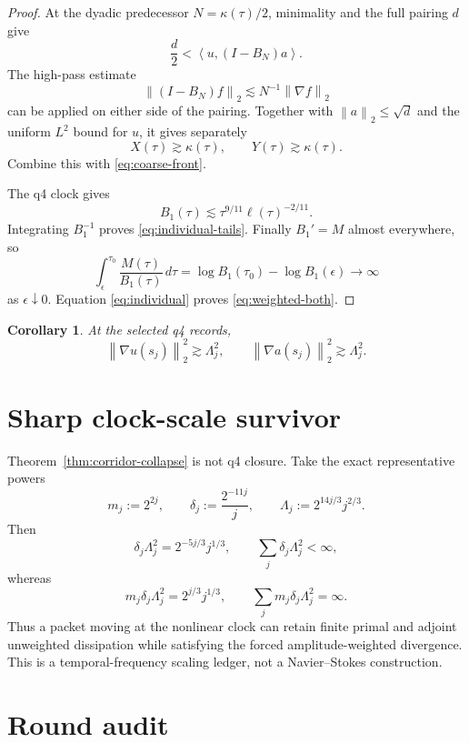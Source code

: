 \documentclass[11pt]{article}
\newtheorem{corollary}[theorem]{Corollary}
\theoremstyle{remark}
\newcommand{\norm}[1]{\left\|#1\right\|}
\newcommand{\ip}[2]{\left\langle#1,#2\right\rangle}
\begin{document}
\begin{proof}
At the dyadic predecessor \(N=\kappa(\tau)/2\), minimality and the full
pairing \(d\) give
\[
 \frac d2<\ip{u}{(I-B_N)a}.
\]
The high-pass estimate
\[
 \norm{(I-B_N)f}_2\lesssim N^{-1}\norm{\nabla f}_2
\]
can be applied on either side of the pairing.  Together with
\(\norm a_2\leq\sqrt d\) and the uniform \(L^2\) bound for \(u\), it
gives separately
\[
 X(\tau)\gtrsim\kappa(\tau),\qquad
 Y(\tau)\gtrsim\kappa(\tau).
\]
Combine this with \eqref{eq:coarse-front}.

The q4 clock gives
\[
 B_1(\tau)
 \lesssim
 \tau^{9/11}\ell(\tau)^{-2/11}.
\]
Integrating \(B_1^{-1}\) proves
\eqref{eq:individual-tails}.  Finally \(B_1'=M\) almost everywhere, so
\[
 \int_\epsilon^{\tau_0}\frac{M(\tau)}{B_1(\tau)}\,d\tau
 =
 \log B_1(\tau_0)-\log B_1(\epsilon)
 \longrightarrow\infty
\]
as \(\epsilon\downarrow0\).  Equation \eqref{eq:individual} proves
\eqref{eq:weighted-both}.
\end{proof}

\begin{corollary}
At the selected q4 records,
\[
 \norm{\nabla u(s_j)}_2^2\gtrsim\Lambda_j^2,\qquad
 \norm{\nabla a(s_j)}_2^2\gtrsim\Lambda_j^2.
\]
\end{corollary}

\section{Sharp clock-scale survivor}

Theorem~\ref{thm:corridor-collapse} is not q4 closure.  Take the exact
representative powers
\[
 m_j:=2^{2j},\qquad
 \delta_j:=\frac{2^{-11j}}j,\qquad
 \Lambda_j:=2^{14j/3}j^{2/3}.
\]
Then
\begin{equation}
\label{eq:unweighted-ledger}
 \delta_j\Lambda_j^2
 =2^{-5j/3}j^{1/3},
 \qquad
 \sum_j\delta_j\Lambda_j^2<\infty,
\end{equation}
whereas
\begin{equation}
\label{eq:weighted-ledger}
 m_j\delta_j\Lambda_j^2
 =2^{j/3}j^{1/3},
 \qquad
 \sum_jm_j\delta_j\Lambda_j^2=\infty.
\end{equation}
Thus a packet moving at the nonlinear clock can retain finite primal
and adjoint unweighted dissipation while satisfying the forced
amplitude-weighted divergence.  This is a temporal-frequency scaling
ledger, not a Navier--Stokes construction.

\section{Round audit}
\end{document}
